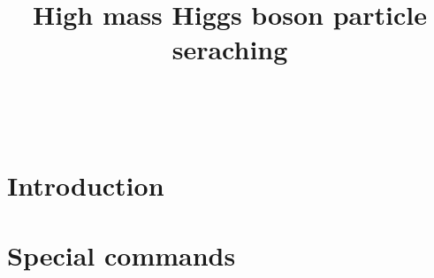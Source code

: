 \documentclass[PhD,binding=0.6cm]{../sapthesis}
\title{High mass Higgs boson particle seraching}
\begin{document}
\newcommand{\aMC}{\textsc{MadGraph}\xspace}\
\newcommand{\qqbar}{$q \bar{q}$}
\newcommand{\POWHEG} {{\textsc{powheg}}\xspace}

\frontmatter

\maketitle

\dedication{ dedica a ...}

\begin{abstract}

\lipsum[1-2]

\end{abstract}

\begin{acknowledgments}[Ringraziamenti]

\lipsum[1-2]

\end{acknowledgments}

\tableofcontents

\chapter{Introduction}

\lipsum[1-2]


\mainmatter


{} 
{} 
{} 
{} 
{} 
{}
{}
{}
{}
{}
{} 
{} 

\appendix
\chapter{Special commands }
\end{document}

